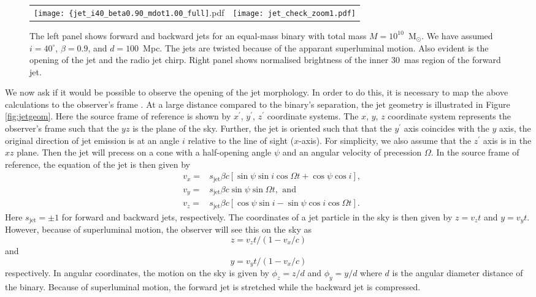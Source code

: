 \documentclass[a4paper,fleqn,usenatbib]{mnras}
\begin{document}
\begin{figure*}
\begin{center}
  \begin{tabular}{cc}
    \texttt{[image: \{jet\_i40\_beta0.90\_mdot1.00\_full]}.pdf} &
    \texttt{[image: jet\_check\_zoom1.pdf]}
  \end{tabular}
\end{center}
\caption{The left panel shows forward and backward jets for an
  equal-mass binary with total mass $M=10^{10}$~M$_\odot$.  We have
  assumed $i=40^\circ$, $\beta=0.9$, and $d = 100$~Mpc.  The jets are
  twisted because of the apparant superluminal motion.  Also evident
  is the opening of the jet and the radio jet chirp.  Right panel
  shows normalised brightness of the inner 30~mas region of the
  forward jet.}
\label{fig:jet_mdot1.0}
\end{figure*}


We now ask if it would be possible to observe the opening of the jet
morphology.  In order to do this, it is necessary to map the above
calculations to the observer's frame \citep{1982ApJ...262..478G}.  At
a large distance compared to the binary's separation, the jet geometry
is illustrated in Figure \ref{fig:jetgeom}.  Here the source frame of
reference is shown by $x^\prime$, $y^\prime$, $z^\prime$ coordinate
systems.  The $x$, $y$, $z$ coordinate system represents the
observer's frame such that the $yz$ is the plane of the sky.  Further,
the jet is oriented such that that the $y^\prime$ axis coincides with
the $y$ axis, the original direction of jet emission is at an angle
$i$ relative to the line of sight ($x$-axis).  For simplicity, we also
assume that the $z^\prime$ axis is in the $xz$ plane.  Then the jet
will precess on a cone with a half-opening angle $\psi$ and an angular
velocity of precession $\Omega$.  In the source frame of reference,
the equation of the jet is then given by \citep{1981ApJ...246L.141H}
\begin{eqnarray}
  &v_x=&s_\mathrm{jet}\beta c\left[\sin\psi\sin i\cos\Omega t+\cos\psi\cos i\right],\\
  &v_y=&s_\mathrm{jet}\beta c\sin\psi\sin\Omega t,~\,\mathrm{and}\\
  &v_z=&s_\mathrm{jet}\beta c\left[\cos\psi\sin i-\sin\psi\cos i\cos\Omega t\right]. 
\end{eqnarray}
Here $s_\mathrm{jet}=\pm 1$ for forward and backward jets,
respectively.  The coordinates of a jet particle in the sky is then
given by $z=v_zt$ and $y=v_yt$.  However, because of superluminal
motion, the observer will see this on the sky as
\begin{equation}
  z=v_zt/(1-v_x/c)
\end{equation}
and
\begin{equation}
  y=v_yt/(1-v_x/c)
\end{equation}
respectively.  In angular coordinates, the motion on the sky is given
by $\phi_z=z/d$ and $\phi_y=y/d$ where $d$ is the angular diameter
distance of the binary.  Because of superluminal motion, the forward
jet is stretched while the backward jet is compressed.
\end{document}
